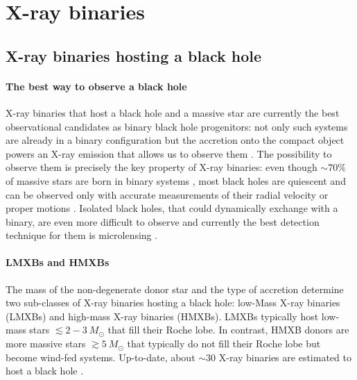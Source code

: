 \documentclass[a4paper,titlepage]{book}     	%
\newcommand{\sun}{\ensuremath{_\odot}}
\newcommand{\msun}{\ensuremath{M\sun}}
\begin{document}
\section{X-ray binaries}

\subsection{X-ray binaries hosting a black hole}\label{subsec:XraybinariesSED}

\paragraph{The best way to observe a black hole}
X-ray binaries that host a black hole and a massive star are currently the best observational candidates as binary black hole progenitors: not only such systems are already in a binary configuration but the accretion onto the compact object powers an X-ray emission that allows us to observe them \cite{Xbinaries_massmeasure}. The possibility to observe them is precisely the key property of X-ray binaries: even though $\sim 70 \%$ of massive stars are born in binary systems \cite{Sana2012}, most black holes are quiescent and can be observed only with accurate measurements of their radial velocity or proper motions \cite{BHnoninteracting_Giesers2018}. Isolated black holes, that could dynamically exchange with a binary, are even more difficult to observe and currently the best detection technique for them is microlensing \cite{BHmicrolensing}.

\paragraph{LMXBs and HMXBs}
The mass of the non-degenerate donor star and the type of accretion determine two sub-classes of X-ray binaries hosting a black hole: low-Mass X-ray binaries (LMXBs) and high-mass X-ray binaries (HMXBs). LMXBs typically host low-mass stars $\lesssim 2-3~\msun$ that fill their Roche lobe. In contrast, HMXB  donors are more massive stars $\gtrsim 5~\msun$ that typically do not fill their Roche lobe but become wind-fed systems. Up-to-date, about $\sim 30$ X-ray binaries are estimated to host a black hole \cite{HMXBH_spins2021}.
\end{document}
